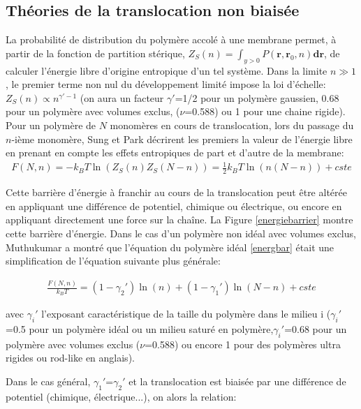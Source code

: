 \subsection{Théories de la translocation non biaisée}


La probabilité de distribution du polymère accolé à une membrane permet, à partir de la fonction de partition stérique, $Z_S(n)= \int_{y>0} P(\textbf{r},\textbf{r}_0,n) \textbf{dr}$, de calculer l'énergie libre d'origine entropique d'un tel système. Dans la limite $n \gg 1$, le premier terme non nul du développement limité impose la loi d'échelle: $Z_S(n) \propto n^{\gamma'-1}$ (on aura un facteur $\gamma'$=1/2 pour un polymère gaussien, 0.68 pour un polymère avec volumes exclus,  ($\nu$=0.588) ou 1 pour une chaine rigide). Pour un polymère de $N$ monomères en cours de translocation, lors du passage du $n$-ième monomère, Sung et Park \cite{Sung1996} décrirent les premiers la valeur de l'énergie libre en prenant en compte les effets entropiques de part et d'autre de la membrane:
\begin{eqnarray}
F(N,n)= -k_BT\ln\left(Z_S(n)Z_S(N-n)\right)= \frac{1}{2} k_BT \ln \left(n(N-n)\right) +cste
\label{energbar}
\end{eqnarray}

Cette barrière d'énergie à franchir au cours de la translocation peut être altérée en appliquant une différence de potentiel, chimique ou électrique, ou encore en appliquant directement une force sur la chaîne. La Figure \ref{energiebarrier} montre cette barrière d'énergie.
 Dans le cas d'un polymère non idéal avec volumes exclus, Muthukumar \cite{Muthukumar1999} a montré que l'équation du polymère idéal \ref{energbar} était une simplification de l'équation suivante plus générale:

\begin{eqnarray}
\frac{F(N,n)}{k_BT}= (1-\gamma_2')\ln(n)+ (1-\gamma_1')\ln(N-n)+cste
\label{energbarsaw}
\end{eqnarray}

avec $\gamma_i'$ l'exposant caractéristique de la taille du polymère dans le milieu i ($\gamma_i'$=0.5 pour un polymère idéal ou un milieu saturé en polymère,$\gamma_i'$=0.68  pour un polymère avec volumes exclus ($\nu$=0.588) ou encore 1 pour des polymères ultra rigides ou rod-like en anglais).

Dans le cas général, $\gamma_1'$=$\gamma_2'$ et la translocation est biaisée par une différence de potentiel (chimique, électrique...), on alors la relation:

